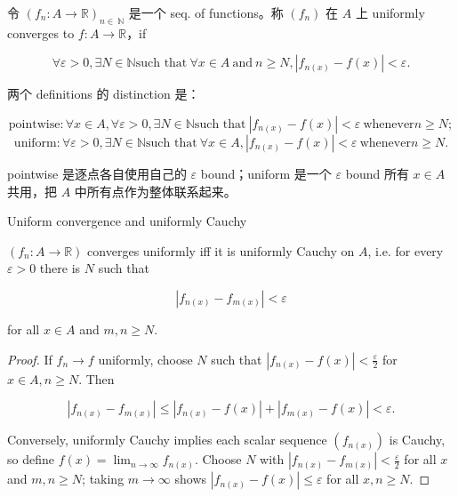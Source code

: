 \begin{definition}{}

令 \(\left( {f_{n}:A\rightarrow\mathbb{R}} \right)_{n \in \ \mathbb{N}}\) 是一个 seq. of functions。称 \(\left( f_{n} \right)\) 在 \(A\) 上 uniformly converges to \(f:A\rightarrow\mathbb{R}\)，if

\[\forall\varepsilon > 0,\exists N \in \mathbb{N}\text{such that}\ \forall x \in A\ \text{and}\ n \geq N,\left| {f_{n{(x)}} - f(x)} \right| < \varepsilon.\]

两个 definitions 的 distinction 是：

\[\text{pointwise}:\forall x \in A,\forall\varepsilon > 0,\exists N \in \mathbb{N}\text{such that}\ \left| {f_{n{(x)}} - f(x)} \right| < \varepsilon\ \text{whenever}n \geq N;\]\[\text{uniform}:\forall\varepsilon > 0,\exists N \in \mathbb{N}\text{such that}\ \forall x \in A,\left| {f_{n{(x)}} - f(x)} \right| < \varepsilon\ \text{whenever}n \geq N.\]

pointwise 是逐点各自使用自己的 \(\varepsilon\) bound；uniform 是一个 \(\varepsilon\) bound 所有 \(x \in A\) 共用，把 \(A\) 中所有点作为整体联系起来。

\end{definition}

\begin{theorem}{Uniform convergence and uniformly Cauchy}

\(\left( {f_{n}:A\rightarrow\mathbb{R}} \right)\) converges uniformly iff it is uniformly Cauchy on \(A\), i.e. for every \(\varepsilon > 0\) there is \(N\) such that

\[\left| {f_{n{(x)}} - f_{m{(x)}}} \right| < \varepsilon\]

for all \(x \in A\) and \(m,n \geq N\).

\end{theorem}

\begin{proof}

If \(f_{n}\rightarrow f\) uniformly, choose \(N\) such that \(\left| {f_{n{(x)}} - f(x)} \right| < \frac{\varepsilon}{2}\) for \(x \in A,n \geq N\). Then

\[\left| {f_{n{(x)}} - f_{m{(x)}}} \right| \leq \left| {f_{n{(x)}} - f(x)} \right| + \left| {f_{m{(x)}} - f(x)} \right| < \varepsilon.\]

Conversely, uniformly Cauchy implies each scalar sequence \(\left( f_{n{(x)}} \right)\) is Cauchy, so define \(f(x) = \lim_{n\rightarrow\infty}f_{n{(x)}}\). Choose \(N\) with \(\left| {f_{n{(x)}} - f_{m{(x)}}} \right| < \frac{\varepsilon}{2}\) for all \(x\) and \(m,n \geq N\); taking \(m\rightarrow\infty\) shows \(\left| {f_{n{(x)}} - f(x)} \right| \leq \varepsilon\) for all \(x,n \geq N\).

\end{proof}

